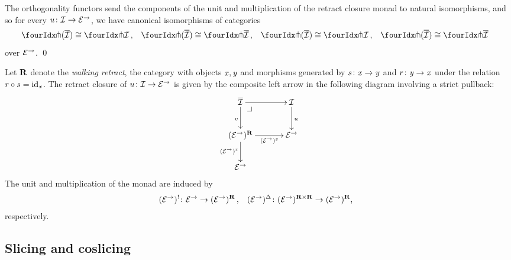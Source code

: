 \documentclass[reqno,10pt,a4paper,oneside,draft]{amsart}
\begin{document}
\begin{proposition} \label{retract-closure}
The orthogonality functors send the components of the unit and multiplication of the retract closure monad to natural isomorphisms, and so for every $u \colon \mathcal{I} \to \mathcal{E}^\to$, we have canonical isomorphisms of categories
\[
\begin{aligned}
  \liftr{(\overline{\cal{I}})} &\iso \liftr{\cal{I}}
\, ,&
  \liftr{(\overline{\overline{\cal{I}}})} &\iso \liftr{\overline{\cal{I}}}
\, ,&
  \liftl{(\overline{\cal{I}})} &\iso \liftl{\cal{I}}
\, ,&
 \liftl{(\overline{\overline{\cal{I}}})} &\iso \liftl{\overline{\cal{I}}}
\end{aligned}
\]
over $\mathcal{E}^\to$.
\qed
\end{proposition}

\begin{remark}
Let $\mathbf{R}$ denote the \emph{walking retract}, \ie the category with objects $\mathit{x}, \mathit{y}$ and morphisms generated by $s \colon \mathit{x} \to \mathit{y}$ and $r \colon \mathit{y} \to \mathit{x}$ under the relation $r \mathbin{\circ} s = \operatorname{id}_{\mathit{x}}$.
The retract closure of $u \colon \mathcal{I} \to \mathcal{E}^\to$ is given by the composite left arrow in the following diagram involving a strict pullback:
\[
\xymatrix@C+1em{
  \overline{\cal{I}}
  \ar[r]
  \ar[d]_v
  \pullback{dr}
&
  \cal{I}
  \ar[d]^{u}
\\
  (\catE^\to)^{\ret}
  \ar[r]_-{(\catE^\to)^{\retB}}
  \ar[d]_{(\catE^\to)^\retA}
&
  \catE^\to
\\
  \catE^\to
}
\]
The unit and multiplication of the monad are induced by
\[
\begin{aligned}
  (\catE^\to)^{\canonical} &\co \catE^\to \to (\catE^\to)^{\ret}
\, ,&
  (\catE^\to)^{\Delta} &\co (\catE^\to)^{\ret \times \ret} \to (\catE^\to)^{\ret}
\rlap{,}
\end{aligned}
\]
respectively.
\end{remark}

\subsection*{Slicing and coslicing}
\end{document}
